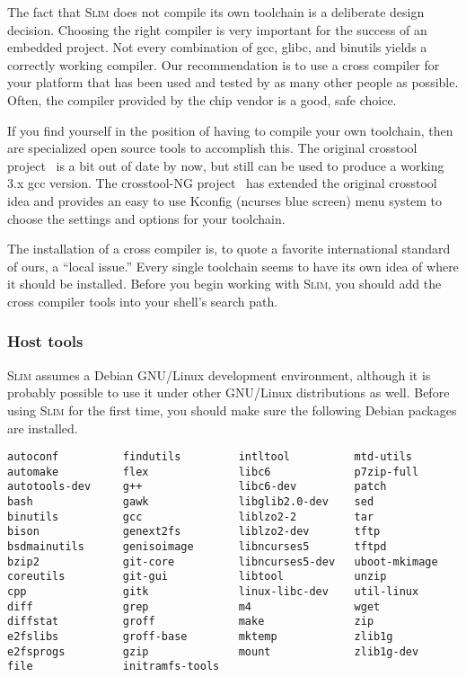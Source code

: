 \documentclass[a4paper,10pt]{article}
\newcommand{\slim}{\textsc{Slim}\xspace}
\begin{document}
    The fact that \slim does not compile its own toolchain is a
    deliberate design decision.  Choosing the right compiler is very
    important for the success of an embedded project.  Not every
    combination of gcc, glibc, and binutils yields a correctly working
    compiler.  Our recommendation is to use a cross compiler for your
    platform that has been used and tested by as many other people as
    possible.  Often, the compiler provided by the chip vendor is a
    good, safe choice.

    If you find yourself in the position of having to compile your own
    toolchain, then are specialized open source tools to accomplish
    this.
    The original crosstool project~\cite{kegel} is a bit out of date
    by now, but still can be used to produce a working 3.x gcc
    version.
    The crosstool-NG project~\cite{morin} has extended the original
    crosstool idea and provides an easy to use Kconfig (ncurses blue
    screen) menu system to choose the settings and options for your
    toolchain.

    The installation of a cross compiler is, to quote a favorite
    international standard of ours, a ``local issue.''  Every single
    toolchain seems to have its own idea of where it should be
    installed.  Before you begin working with \slim, you should add
    the cross compiler tools into your shell's search path.

\subsubsection{Host tools}

    \slim assumes a Debian GNU/Linux development environment, although
    it is probably possible to use it under other GNU/Linux
    distributions as well. Before using \slim for the first time, you
    should make sure the following Debian packages are installed.

\begin{verbatim}
autoconf          findutils         intltool          mtd-utils
automake          flex              libc6             p7zip-full
autotools-dev     g++               libc6-dev         patch
bash              gawk              libglib2.0-dev    sed
binutils          gcc               liblzo2-2         tar
bison             genext2fs         liblzo2-dev       tftp
bsdmainutils      genisoimage       libncurses5       tftpd
bzip2             git-core          libncurses5-dev   uboot-mkimage
coreutils         git-gui           libtool           unzip
cpp               gitk              linux-libc-dev    util-linux
diff              grep              m4                wget
diffstat          groff             make              zip
e2fslibs          groff-base        mktemp            zlib1g
e2fsprogs         gzip              mount             zlib1g-dev
file              initramfs-tools
\end{verbatim}
\end{document}
